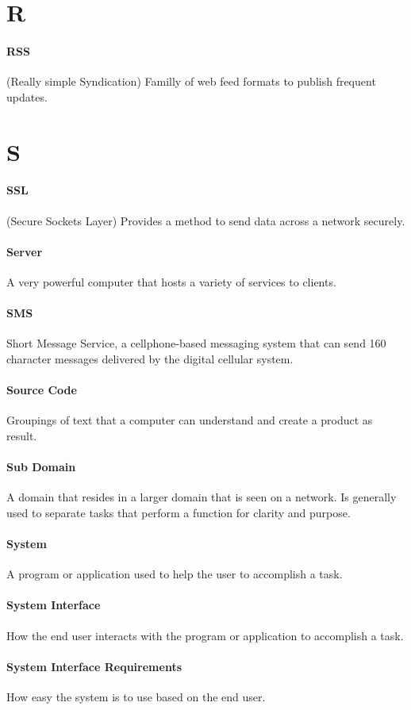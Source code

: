 \documentclass[letterpaper,12pt]{report}
\begin{document}
\section*{R}
\paragraph{RSS} (Really simple Syndication) Familly of web feed formats to publish frequent updates.
\section*{S}
\paragraph{SSL} (Secure Sockets Layer) Provides a method to send data across a network securely.
\paragraph{Server} A very powerful computer that hosts a variety of services to clients.
\paragraph{SMS} Short Message Service, a cellphone-based messaging system that can send 160 character messages delivered by the digital cellular system.
\paragraph{Source Code} Groupings of text that a computer can understand and create a product as result.
\paragraph{Sub Domain} A domain that resides in a larger domain that is seen on a network. Is generally used to separate tasks that perform a function for clarity and purpose.
\paragraph{System} A program or application used to help the user to accomplish a task.
\paragraph{System Interface} How the end user interacts with the program or application to accomplish a task.
\paragraph{System Interface Requirements} How easy the system is to use based on the end user.
\end{document}
